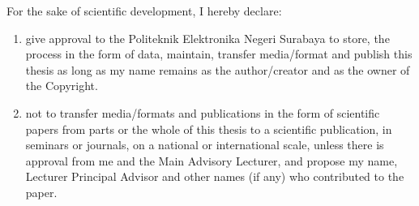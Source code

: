 \begin{publication}
For the sake of scientific development, I hereby declare:

\begin{enumerate}
    \item give approval to the Politeknik Elektronika Negeri Surabaya to store, the process in the form of data, maintain, transfer media/format and publish this thesis as long as my name remains as the author/creator and as the owner of the Copyright.
    \item not to transfer media/formats and publications in the form of scientific papers from parts or the whole of this thesis to a scientific publication, in seminars or journals, on a national or international scale, unless there is approval from me and the Main Advisory Lecturer, and propose my name, Lecturer Principal Advisor and other names (if any) who contributed to the paper.
\end{enumerate}


\end{publication}